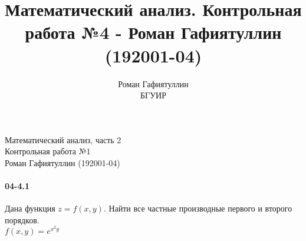\documentclass[12pt]{article}
\title{Математический анализ. Контрольная работа №4 - Роман Гафиятуллин (192001-04)}
\author{Роман Гафиятуллин\\ БГУИР}
\begin{document}
	\begin{titlepage}
		\begin{center}
			{\Large Математический анализ, часть 2 \\ Контрольная работа №1 \\ Роман Гафиятуллин (192001-04)}
		\end{center}
	\end{titlepage}
	\clearpage
	\paragraph{04-4.1} Дана функция $z = f(x,y)$. Найти все частные производные первого и второго порядков. \\
	\ensuremath{
		f(x,y) = e^{x^{2}y}
	}

	
\end{document}
